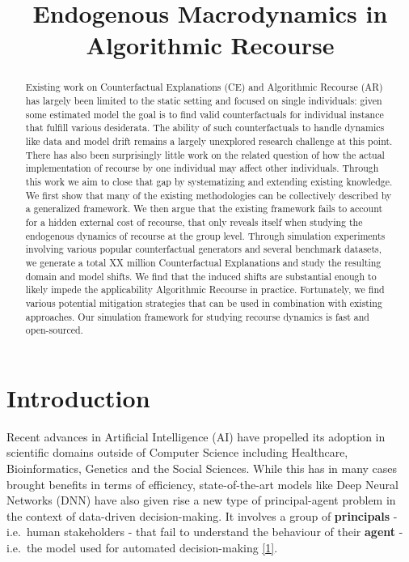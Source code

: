 \documentclass[
  conference]{IEEEtran}
\title{Endogenous Macrodynamics in Algorithmic Recourse}
\author{}
\date{}
\begin{document}
\maketitle
\begin{abstract}
Existing work on Counterfactual Explanations (CE) and Algorithmic
Recourse (AR) has largely been limited to the static setting and focused
on single individuals: given some estimated model the goal is to find
valid counterfactuals for individual instance that fulfill various
desiderata. The ability of such counterfactuals to handle dynamics like
data and model drift remains a largely unexplored research challenge at
this point. There has also been surprisingly little work on the related
question of how the actual implementation of recourse by one individual
may affect other individuals. Through this work we aim to close that gap
by systematizing and extending existing knowledge. We first show that
many of the existing methodologies can be collectively described by a
generalized framework. We then argue that the existing framework fails
to account for a hidden external cost of recourse, that only reveals
itself when studying the endogenous dynamics of recourse at the group
level. Through simulation experiments involving various popular
counterfactual generators and several benchmark datasets, we generate a
total XX million Counterfactual Explanations and study the resulting
domain and model shifts. We find that the induced shifts are substantial
enough to likely impede the applicability Algorithmic Recourse in
practice. Fortunately, we find various potential mitigation strategies
that can be used in combination with existing approaches. Our simulation
framework for studying recourse dynamics is fast and open-sourced.
\end{abstract}
\ifdefined\Shaded\renewenvironment{Shaded}{\begin{tcolorbox}[sharp corners, borderline west={3pt}{0pt}{shadecolor}, boxrule=0pt, enhanced, frame hidden, breakable, interior hidden]}{\end{tcolorbox}}\fi

\hypertarget{sec-intro}{%
\section{Introduction}\label{sec-intro}}

Recent advances in Artificial Intelligence (AI) have propelled its
adoption in scientific domains outside of Computer Science including
Healthcare, Bioinformatics, Genetics and the Social Sciences. While this
has in many cases brought benefits in terms of efficiency,
state-of-the-art models like Deep Neural Networks (DNN) have also given
rise a new type of principal-agent problem in the context of data-driven
decision-making. It involves a group of \textbf{principals} - i.e.~human
stakeholders - that fail to understand the behaviour of their
\textbf{agent} - i.e.~the model used for automated decision-making
\protect\hyperlink{ref-borch2022machine}{{[}1{]}}.
\end{document}

